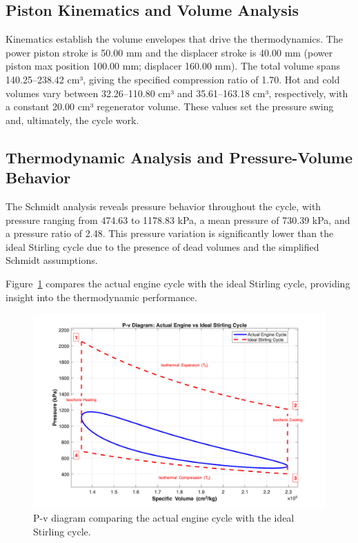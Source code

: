 \documentclass[12pt]{article}
\begin{document}
\subsection{Piston Kinematics and Volume Analysis}
Kinematics establish the volume envelopes that drive the thermodynamics. The power piston stroke is 50.00 mm and the displacer stroke is 40.00 mm (power piston max position 100.00 mm; displacer 160.00 mm). The total volume spans 140.25–238.42 cm³, giving the specified compression ratio of 1.70. Hot and cold volumes vary between 32.26–110.80 cm³ and 35.61–163.18 cm³, respectively, with a constant 20.00 cm³ regenerator volume. These values set the pressure swing and, ultimately, the cycle work.

\subsection{Thermodynamic Analysis and Pressure-Volume Behavior}
The Schmidt analysis reveals pressure behavior throughout the cycle, with pressure ranging from 474.63 to 1178.83 kPa, a mean pressure of 730.39 kPa, and a pressure ratio of 2.48. This pressure variation is significantly lower than the ideal Stirling cycle due to the presence of dead volumes and the simplified Schmidt assumptions.

Figure~\ref{fig:pv_diagram} compares the actual engine cycle with the ideal Stirling cycle, providing insight into the thermodynamic performance.

\begin{figure}[htbp]
  \centering
  \includegraphics[width=0.8\linewidth]{../pv_diagram.png}
  \caption{P-v diagram comparing the actual engine cycle with the ideal Stirling cycle.}
  \label{fig:pv_diagram}
\vspace{-6pt}\end{figure}
\end{document}
